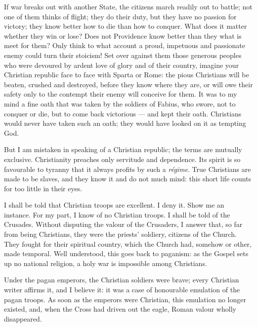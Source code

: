\documentclass[12pt]{report}
\begin{document}
If war breaks out with another State, the citizens march readily out to battle; not one of them thinks of flight; they do their duty, but they have no passion for victory; they know better how to die than how to conquer. What does it matter whether they win or lose? Does not Providence know better than they what is meet for them? Only think to what account a proud, impetuous and passionate enemy could turn their stoicism! Set over against them those generous peoples who were devoured by ardent love of glory and of their country, imagine your Christian republic face to face with Sparta or Rome: the pious Christians will be beaten, crushed and destroyed, before they know where they are, or will owe their safety only to the contempt their enemy will conceive for them. It was to my mind a fine oath that was taken by the soldiers of Fabius, who swore, not to conquer or die, but to come back victorious — and kept their oath. Christians would never have taken such an oath; they would have looked on it as tempting God.

But I am mistaken in speaking of a Christian republic; the terms are mutually exclusive. Christianity preaches only servitude and dependence. Its spirit is so favourable to tyranny that it always profits by such a \textit{régime}. True Christians are made to be slaves, and they know it and do not much mind: this short life counts for too little in their eyes.

I shall be told that Christian troops are excellent. I deny it. Show me an instance. For my part, I know of no Christian troops. I shall be told of the Crusades. Without disputing the valour of the Crusaders, I answer that, so far from being Christians, they were the priests' soldiery, citizens of the Church. They fought for their spiritual country, which the Church had, somehow or other, made temporal. Well understood, this goes back to paganism: as the Gospel sets up no national religion, a holy war is impossible among Christians.

Under the pagan emperors, the Christian soldiers were brave; every Christian writer affirms it, and I believe it: it was a case of honourable emulation of the pagan troops. As soon as the emperors were Christian, this emulation no longer existed, and, when the Cross had driven out the eagle, Roman valour wholly disappeared.
\end{document}
